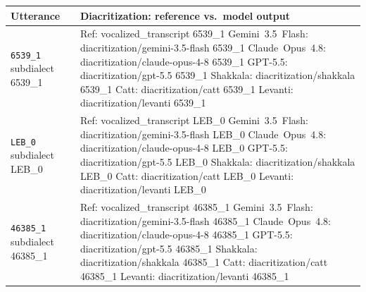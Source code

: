 \begin{table}[t]
\centering
\small
\begin{tabular}{p{} p{}}
\toprule
\textbf{Utterance} & \textbf{Diacritization: reference vs.\ model output} \\
\midrule
\texttt{6539\_1} \newline \scriptsize {{subdialect 6539_1}} & Ref: {{vocalized_transcript 6539_1}} \newline Gemini~3.5~Flash: {{diacritization/gemini-3.5-flash 6539_1}} \newline Claude~Opus~4.8: {{diacritization/claude-opus-4-8 6539_1}} \newline GPT-5.5: {{diacritization/gpt-5.5 6539_1}} \newline Shakkala: {{diacritization/shakkala 6539_1}} \newline Catt: {{diacritization/catt 6539_1}} \newline Levanti: {{diacritization/levanti 6539_1}} \\
\addlinespace[4pt]
\texttt{LEB\_0} \newline \scriptsize {{subdialect LEB_0}} & Ref: {{vocalized_transcript LEB_0}} \newline Gemini~3.5~Flash: {{diacritization/gemini-3.5-flash LEB_0}} \newline Claude~Opus~4.8: {{diacritization/claude-opus-4-8 LEB_0}} \newline GPT-5.5: {{diacritization/gpt-5.5 LEB_0}} \newline Shakkala: {{diacritization/shakkala LEB_0}} \newline Catt: {{diacritization/catt LEB_0}} \newline Levanti: {{diacritization/levanti LEB_0}} \\
\addlinespace[4pt]
\texttt{46385\_1} \newline \scriptsize {{subdialect 46385_1}} & Ref: {{vocalized_transcript 46385_1}} \newline Gemini~3.5~Flash: {{diacritization/gemini-3.5-flash 46385_1}} \newline Claude~Opus~4.8: {{diacritization/claude-opus-4-8 46385_1}} \newline GPT-5.5: {{diacritization/gpt-5.5 46385_1}} \newline Shakkala: {{diacritization/shakkala 46385_1}} \newline Catt: {{diacritization/catt 46385_1}} \newline Levanti: {{diacritization/levanti 46385_1}} \\

\end{tabular}
\end{table}
